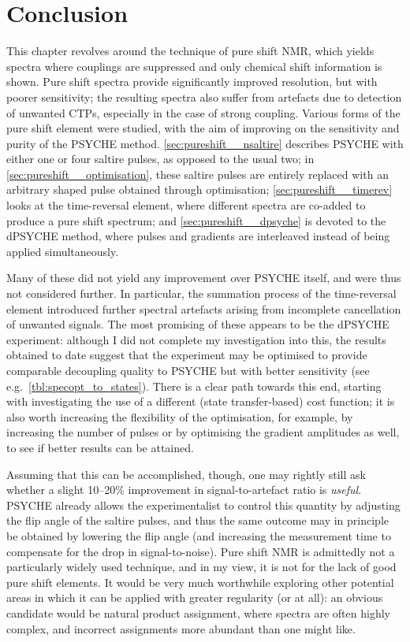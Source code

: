 \section{Conclusion}
\label{sec:pureshift__conclusion}

This chapter revolves around the technique of pure shift NMR, which yields spectra where couplings are suppressed and only chemical shift information is shown.
Pure shift spectra provide significantly improved resolution, but with poorer sensitivity; the resulting spectra also suffer from artefacts due to detection of unwanted CTPs, especially in the case of strong coupling.
Various forms of the pure shift element were studied, with the aim of improving on the sensitivity and purity of the PSYCHE method\autocite{Foroozandeh2014ACIE}.
\cref{sec:pureshift__nsaltire} describes PSYCHE with either one or four saltire pulses, as opposed to the usual two;
in \cref{sec:pureshift__optimisation}, these saltire pulses are entirely replaced with an arbitrary shaped pulse obtained through optimisation;
\cref{sec:pureshift__timerev} looks at the time-reversal element, where different spectra are co-added to produce a pure shift spectrum;
and \cref{sec:pureshift__dpsyche} is devoted to the dPSYCHE method, where pulses and gradients are interleaved instead of being applied simultaneously.

Many of these did not yield any improvement over PSYCHE itself, and were thus not considered further.
In particular, the summation process of the time-reversal element introduced further spectral artefacts arising from incomplete cancellation of unwanted signals.
The most promising of these appears to be the dPSYCHE experiment: although I did not complete my investigation into this, the results obtained to date suggest that the experiment may be optimised to provide comparable decoupling quality to PSYCHE but with better sensitivity (see e.g.\ \cref{tbl:specopt_to_states}).
There is a clear path towards this end, starting with investigating the use of a different (state transfer-based) cost function; it is also worth increasing the flexibility of the optimisation, for example, by increasing the number of pulses or by optimising the gradient amplitudes as well, to see if better results can be attained.

Assuming that this can be accomplished, though, one may rightly still ask whether a slight 10--20\% improvement in signal-to-artefact ratio is \textit{useful}.
PSYCHE already allows the experimentalist to control this quantity by adjusting the flip angle of the saltire pulses, and thus the same outcome may in principle be obtained by lowering the flip angle (and increasing the measurement time to compensate for the drop in signal-to-noise).
Pure shift NMR is admittedly not a particularly widely used technique, and in my view, it is not for the lack of good pure shift elements.
It would be very much worthwhile exploring other potential areas in which it can be applied with greater regularity (or at all): an obvious candidate would be natural product assignment, where spectra are often highly complex, and incorrect assignments more abundant than one might like.\autocite{Nicolaou2005ACIE}


